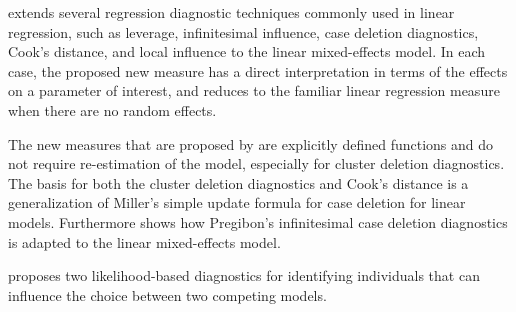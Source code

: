 \documentclass[12pt, a4paper]{report}
\theoremstyle{plain}
\theoremstyle{definition}
\theoremstyle{remark}
\begin{document}


\citet{Demi} extends several regression diagnostic techniques commonly used in linear regression, such as leverage, infinitesimal influence, case deletion diagnostics, Cook's distance, and local influence to the linear mixed-effects model. In each case, the proposed new measure has a direct interpretation in terms of the effects on a parameter of interest, and reduces to the familiar linear regression measure when there are no random effects. 

The new measures that are proposed by \citet{Demi} are explicitly defined functions and do not require re-estimation of the model, especially for cluster deletion diagnostics. The basis for both the cluster deletion diagnostics and Cook's distance is a generalization of Miller's simple update formula for case deletion for linear models. Furthermore \citet{Demi} shows how Pregibon's infinitesimal case deletion diagnostics is adapted to the linear mixed-effects model. 


%
%
%

\citet{Demi} proposes two likelihood-based diagnostics for identifying individuals that can influence the choice between two competing models.


\newpage




\end{document}
